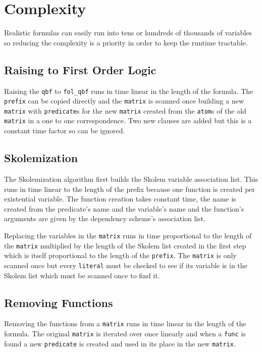 \section{Complexity}
Realistic formulas can easily run into tens or hundreds of thousands of variables so reducing the complexity is a priority in order to keep the runtime tractable.

\subsection{Raising to First Order Logic}
Raising the \texttt{qbf} to \texttt{fol\_qbf} runs in time linear in the length of the formula. The \texttt{prefix} can be copied directly and the \texttt{matrix} is scanned once building a new \texttt{matrix} with \texttt{predicate}s for the new \texttt{matrix} created from the \texttt{atom}s of the old \texttt{matrix} in a one to one correspondence. Two new clauses are added but this is a constant time factor so can be ignored.

\subsection{Skolemization}
The Skolemization algorithm first builds the Skolem variable association list. This runs in time linear to the length of the prefix because one function is created per existential variable. The function creation takes constant time, the name is created from the predicate's name and the variable's name and the function's arguments are given by the dependency scheme's association list.

Replacing the variables in the \texttt{matrix} runs in time proportional to the length of the \texttt{matrix} multiplied by the length of the Skolem list created in the first step which is itself proportional to the length of the \texttt{prefix}. The \texttt{matrix} is only scanned once but every \texttt{literal} must be checked to see if its variable is in the Skolem list which must be scanned once to find it.

\subsection{Removing Functions}
Removing the functions from a \texttt{matrix} runs in time linear in the length of the formula. The original \texttt{matrix} is iterated over once linearly and when a \texttt{func} is found a new \texttt{predicate} is created and used in its place in the new \texttt{matrix}.

